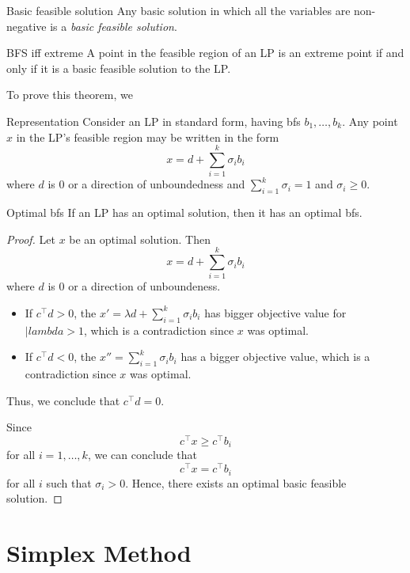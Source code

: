 \begin{definition}{Basic feasible solution}{}
Any basic solution in which all the variables are non-negative is a \emph{basic feasible solution}.
\end{definition}

\begin{theorem}{BFS iff extreme}{}
A point in the feasible region of an LP is an extreme point if and only if it is a basic feasible solution to the LP.
\end{theorem}

To prove this theorem, we 

\begin{theorem}{Representation}{}
Consider an LP in standard form, having bfs $b_1, \dots, b_k$.  Any point $x$ in the LP's feasible region may be written in the form 
$$
x = d + \sum_{i=1}^k \sigma_i b_i
$$
where $d$ is $0$ or a direction of unboundedness and $\sum_{i=1}^k \sigma_i = 1$ and $\sigma_i \geq 0$.
\end{theorem}

\begin{theorem}{Optimal bfs}{}
If an LP has an optimal solution, then it has an optimal bfs.
\end{theorem}

\begin{proof}
Let $x$ be an optimal solution.  Then 
$$
x = d + \sum_{i=1}^k \sigma_i b_i
$$
where $d$ is 0 or a direction of unboundeness.  

\begin{itemize}
\item If $c^\top d > 0$, the $x'  = \lambda d + \sum_{i=1}^k \sigma_i b_i$ has bigger objective value for $|lambda > 1$, which is a contradiction since $x$ was optimal. 
\item If $c^\top d < 0$, the $x'' =\sum_{i=1}^k \sigma_i b_i$ has a bigger objective value, which is a contradiction since $x$ was optimal.
\end{itemize}
Thus, we conclude that $c^\top d = 0$.

Since $$c^\top x \geq c^\top b_i$$ for all $i=1, \dots, k$, we can conclude that 
$$
c^\top x = c^\top b_i
$$
for all $i$ such that $\sigma_i > 0$.   Hence, there exists an optimal basic feasible solution.
\end{proof}

\section{Simplex Method}


